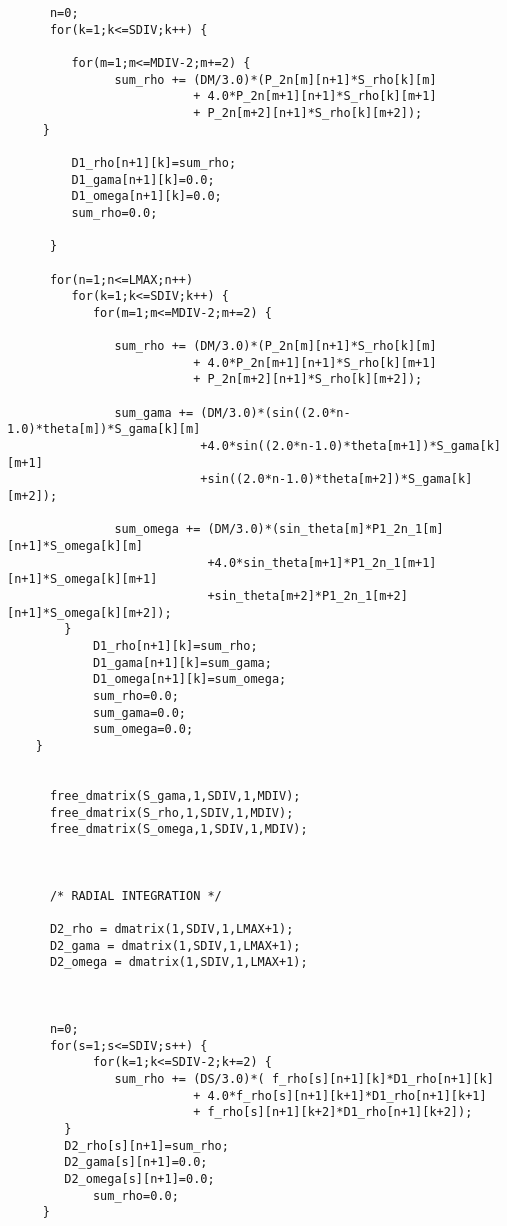 \begin{verbatim}
      n=0;
      for(k=1;k<=SDIV;k++) {      

         for(m=1;m<=MDIV-2;m+=2) {
               sum_rho += (DM/3.0)*(P_2n[m][n+1]*S_rho[k][m]
                          + 4.0*P_2n[m+1][n+1]*S_rho[k][m+1] 
                          + P_2n[m+2][n+1]*S_rho[k][m+2]);
	 }

         D1_rho[n+1][k]=sum_rho;
         D1_gama[n+1][k]=0.0;
         D1_omega[n+1][k]=0.0;
         sum_rho=0.0;

      }

      for(n=1;n<=LMAX;n++)
         for(k=1;k<=SDIV;k++) {      
            for(m=1;m<=MDIV-2;m+=2) {

               sum_rho += (DM/3.0)*(P_2n[m][n+1]*S_rho[k][m]
                          + 4.0*P_2n[m+1][n+1]*S_rho[k][m+1] 
                          + P_2n[m+2][n+1]*S_rho[k][m+2]);
                       
               sum_gama += (DM/3.0)*(sin((2.0*n-1.0)*theta[m])*S_gama[k][m]
                           +4.0*sin((2.0*n-1.0)*theta[m+1])*S_gama[k][m+1]
                           +sin((2.0*n-1.0)*theta[m+2])*S_gama[k][m+2]);
  
               sum_omega += (DM/3.0)*(sin_theta[m]*P1_2n_1[m][n+1]*S_omega[k][m]
                            +4.0*sin_theta[m+1]*P1_2n_1[m+1][n+1]*S_omega[k][m+1]
                            +sin_theta[m+2]*P1_2n_1[m+2][n+1]*S_omega[k][m+2]);
	    }
            D1_rho[n+1][k]=sum_rho;
            D1_gama[n+1][k]=sum_gama;
            D1_omega[n+1][k]=sum_omega;
            sum_rho=0.0;
            sum_gama=0.0;
            sum_omega=0.0;
	}


      free_dmatrix(S_gama,1,SDIV,1,MDIV);
      free_dmatrix(S_rho,1,SDIV,1,MDIV);
      free_dmatrix(S_omega,1,SDIV,1,MDIV);



      /* RADIAL INTEGRATION */

      D2_rho = dmatrix(1,SDIV,1,LMAX+1);
      D2_gama = dmatrix(1,SDIV,1,LMAX+1);
      D2_omega = dmatrix(1,SDIV,1,LMAX+1);



      n=0;
      for(s=1;s<=SDIV;s++) {
            for(k=1;k<=SDIV-2;k+=2) { 
               sum_rho += (DS/3.0)*( f_rho[s][n+1][k]*D1_rho[n+1][k] 
                          + 4.0*f_rho[s][n+1][k+1]*D1_rho[n+1][k+1]
                          + f_rho[s][n+1][k+2]*D1_rho[n+1][k+2]);
 	    }
	    D2_rho[s][n+1]=sum_rho;
	    D2_gama[s][n+1]=0.0;
	    D2_omega[s][n+1]=0.0;
            sum_rho=0.0;
	 }


\end{verbatim}
